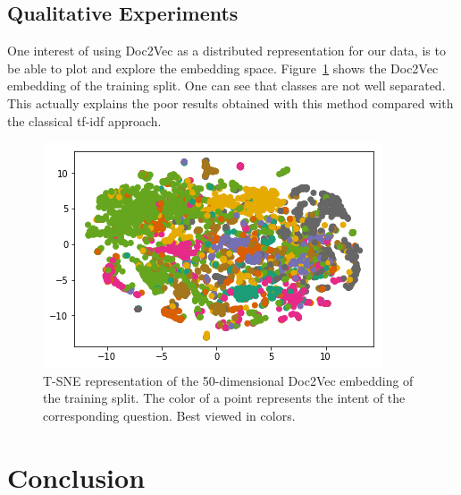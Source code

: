 \documentclass[11pt,twocolumn,letterpaper]{article}
\begin{document}
\subsection{Qualitative Experiments}
\label{sec:qualitative-exp}

One interest of using Doc2Vec as a distributed representation for our data, is to be able to plot and explore the embedding space. Figure~\ref{fig:embedding} shows the Doc2Vec embedding of the training split. One can see that classes are not well separated. This actually explains the poor results obtained with this method compared with the classical tf-idf approach.

\begin{figure}
\centering
\includegraphics[width=0.95\linewidth]{images/embedding}
\caption{T-SNE representation of the 50-dimensional Doc2Vec embedding of the training split. The color of a point represents the intent of the corresponding question. Best viewed in colors.}
\label{fig:embedding}
\end{figure}

\section{Conclusion}

\end{document}
